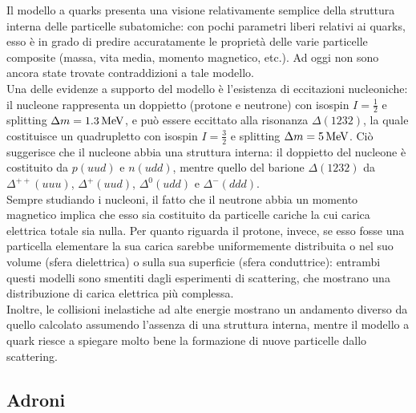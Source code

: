 Il modello a quarks presenta una visione relativamente semplice della struttura interna delle particelle subatomiche: con pochi parametri liberi relativi ai quarks, esso è in grado di predire accuratamente le proprietà delle varie particelle composite (massa, vita media, momento magnetico, etc.). Ad oggi non sono ancora state trovate contraddizioni a tale modello.\\
Una delle evidenze a supporto del modello è l'esistenza di eccitazioni nucleoniche: il nucleone rappresenta un doppietto (protone e neutrone) con isospin $ I = \frac{1}{2} $ e splitting $ \Delta m = 1.3\,\mathrm{MeV} $, e può essere eccittato alla risonanza $ \Delta (1232) $, la quale costituisce un quadrupletto con isospin $ I = \frac{3}{2} $ e splitting $ \Delta m = 5\,\mathrm{MeV} $. Ciò suggerisce che il nucleone abbia una struttura interna: il doppietto del nucleone è costituito da $ p (uud) $ e $ n (udd) $, mentre quello del barione $ \Delta (1232) $ da $ \Delta^{++} (uuu) $, $ \Delta^+ (uud) $, $ \Delta^0 (udd) $ e $ \Delta^- (ddd) $.\\
Sempre studiando i nucleoni, il fatto che il neutrone abbia un momento magnetico implica che esso sia costituito da particelle cariche la cui carica elettrica totale sia nulla. Per quanto riguarda il protone, invece, se esso fosse una particella elementare la sua carica sarebbe uniformemente distribuita o nel suo volume (sfera dielettrica) o sulla sua superficie (sfera conduttrice): entrambi questi modelli sono smentiti dagli esperimenti di scattering, che mostrano una distribuzione di carica elettrica più complessa.\\
Inoltre, le collisioni inelastiche ad alte energie mostrano un andamento diverso da quello calcolato assumendo l'assenza di una struttura interna, mentre il modello a quark riesce a spiegare molto bene la formazione di nuove particelle dallo scattering.

\subsection{Adroni}

